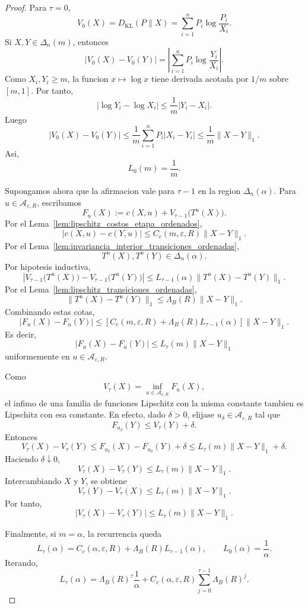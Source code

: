 \documentclass[12pt]{article}
\begin{document}
\begin{proof}
Para \(\tau=0\),
\[
V_0(X)
=
D_{\mathrm{KL}}(P\|X)
=
\sum_{i=1}^n P_i\log\frac{P_i}{X_i}.
\]
Si \(X,Y\in\Delta_n(m)\), entonces
\[
\left|
V_0(X)-V_0(Y)
\right|
=
\left|
\sum_{i=1}^n P_i\log\frac{Y_i}{X_i}
\right|.
\]
Como \(X_i,Y_i\ge m\), la funcion \(x\mapsto \log x\) tiene derivada acotada por \(1/m\) sobre \([m,1]\). Por tanto,
\[
\left|
\log Y_i-\log X_i
\right|
\le
\frac1m|Y_i-X_i|.
\]
Luego
\[
|V_0(X)-V_0(Y)|
\le
\frac1m\sum_{i=1}^n P_i|X_i-Y_i|
\le
\frac1m\|X-Y\|_1.
\]
Asi,
\[
L_0(m)=\frac1m.
\]

Supongamos ahora que la afirmacion vale para \(\tau-1\) en la region \(\Delta_n(\alpha)\). Para \(u\in\mathcal A_{\varepsilon,R}\), escribamos
\[
F_u(X)
:=
c(X,u)+V_{\tau-1}\bigl(T^u(X)\bigr).
\]
Por el Lema~\ref{lem:lipschitz_costos_etapa_ordenados},
\[
|c(X,u)-c(Y,u)|
\le
C_c(m,\varepsilon,R)\|X-Y\|_1.
\]
Por el Lema~\ref{lem:invariancia_interior_transiciones_ordenadas},
\[
T^u(X),T^u(Y)\in\Delta_n(\alpha).
\]
Por hipotesis inductiva,
\[
\left|
V_{\tau-1}\bigl(T^u(X)\bigr)
-
V_{\tau-1}\bigl(T^u(Y)\bigr)
\right|
\le
L_{\tau-1}(\alpha)
\|T^u(X)-T^u(Y)\|_1.
\]
Por el Lema~\ref{lem:lipschitz_transiciones_ordenadas},
\[
\|T^u(X)-T^u(Y)\|_1
\le
\Lambda_B(R)\|X-Y\|_1.
\]
Combinando estas cotas,
\[
|F_u(X)-F_u(Y)|
\le
\left[
C_c(m,\varepsilon,R)
+
\Lambda_B(R)L_{\tau-1}(\alpha)
\right]
\|X-Y\|_1.
\]
Es decir,
\[
|F_u(X)-F_u(Y)|
\le
L_\tau(m)\|X-Y\|_1
\]
uniformemente en \(u\in\mathcal A_{\varepsilon,R}\).

Como
\[
V_\tau(X)=\inf_{u\in\mathcal A_{\varepsilon,R}}F_u(X),
\]
el infimo de una familia de funciones Lipschitz con la misma constante tambien es Lipschitz con esa constante. En efecto, dado \(\delta>0\), elijase \(u_\delta\in\mathcal A_{\varepsilon,R}\) tal que
\[
F_{u_\delta}(Y)
\le
V_\tau(Y)+\delta.
\]
Entonces
\[
V_\tau(X)-V_\tau(Y)
\le
F_{u_\delta}(X)-F_{u_\delta}(Y)+\delta
\le
L_\tau(m)\|X-Y\|_1+\delta.
\]
Haciendo \(\delta\downarrow0\),
\[
V_\tau(X)-V_\tau(Y)
\le
L_\tau(m)\|X-Y\|_1.
\]
Intercambiando \(X\) y \(Y\), se obtiene
\[
V_\tau(Y)-V_\tau(X)
\le
L_\tau(m)\|X-Y\|_1.
\]
Por tanto,
\[
|V_\tau(X)-V_\tau(Y)|
\le
L_\tau(m)\|X-Y\|_1.
\]

Finalmente, si \(m=\alpha\), la recurrencia queda
\[
L_\tau(\alpha)
=
C_c(\alpha,\varepsilon,R)
+
\Lambda_B(R)L_{\tau-1}(\alpha),
\qquad
L_0(\alpha)=\frac1\alpha.
\]
Iterando,
\[
L_\tau(\alpha)
=
\Lambda_B(R)^\tau\frac1\alpha
+
C_c(\alpha,\varepsilon,R)
\sum_{j=0}^{\tau-1}\Lambda_B(R)^j.
\]
\end{proof}
\end{document}
